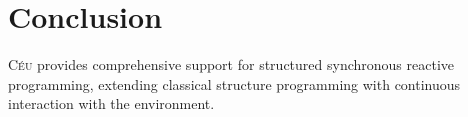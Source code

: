 \documentclass{sigplanconf}
\newcommand{\CEU}{\textsc{C\'{e}u}\xspace}
\newcommand{\1}{\;}
\newcommand{\2}{\;\;}
\newcommand{\3}{\;\;\;}
\newcommand{\5}{\;\;\;\;\;}
\begin{document}

\section{Conclusion}
\label{sec.conclusion}

\CEU provides comprehensive support for structured synchronous reactive 
programming, extending classical structure programming with continuous 
interaction with the environment.
\end{document}
